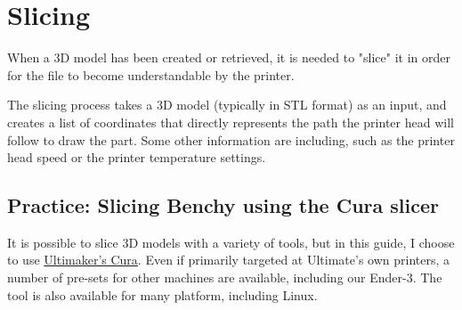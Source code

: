 \documentclass[a4paper,11pt]{article}
\begin{document}



\section{Slicing}
\label{sec:org1941b78}
When a 3D model has been created or retrieved, it is needed to "slice" it in order for the file to become
understandable by the printer.

The slicing process takes a 3D model (typically in STL format) as an input, and creates a list of coordinates that directly represents
the path the printer head will follow to draw the part. Some other information are including, such as the printer head
speed or the printer temperature settings.

\subsection{Practice: Slicing Benchy using the Cura slicer}
\label{sec:orgf5fa04d}
It is possible to slice 3D models with a variety of tools, but in this guide, I choose to use
\href{https://ultimaker.com/software/ultimaker-cura/}{Ultimaker's Cura}. Even if primarily targeted at Ultimate's own printers, a number of
pre-sets for other machines are available, including our Ender-3.
The tool is also available for many platform, including Linux.
\end{document}
